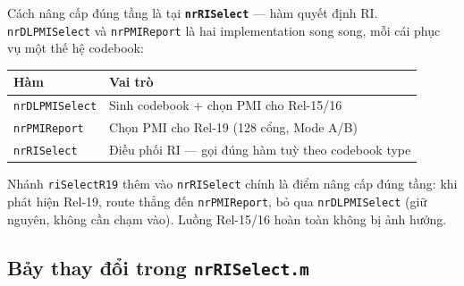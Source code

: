 \documentclass[11pt,a4paper]{article}
\begin{document}
Cách nâng cấp đúng tầng là tại \textbf{\texttt{nrRISelect}} --- hàm quyết định RI.
\texttt{nrDLPMISelect} và \texttt{nrPMIReport} là hai implementation song song,
mỗi cái phục vụ một thế hệ codebook:

\begin{center}
\begin{tabular}{ll}
\toprule
\textbf{Hàm} & \textbf{Vai trò} \\
\midrule
\texttt{nrDLPMISelect} & Sinh codebook + chọn PMI cho Rel-15/16 \\
\texttt{nrPMIReport}   & Chọn PMI cho Rel-19 (128 cổng, Mode A/B) \\
\texttt{nrRISelect}    & Điều phối RI --- gọi đúng hàm tuỳ theo codebook type \\
\bottomrule
\end{tabular}
\end{center}

Nhánh \texttt{riSelectR19} thêm vào \texttt{nrRISelect} chính là điểm nâng cấp
đúng tầng: khi phát hiện Rel-19, route thẳng đến \texttt{nrPMIReport},
bỏ qua \texttt{nrDLPMISelect} (giữ nguyên, không cần chạm vào).
Luồng Rel-15/16 hoàn toàn không bị ảnh hưởng.

\subsection{Bảy thay đổi trong \texttt{nrRISelect.m}}
\end{document}
